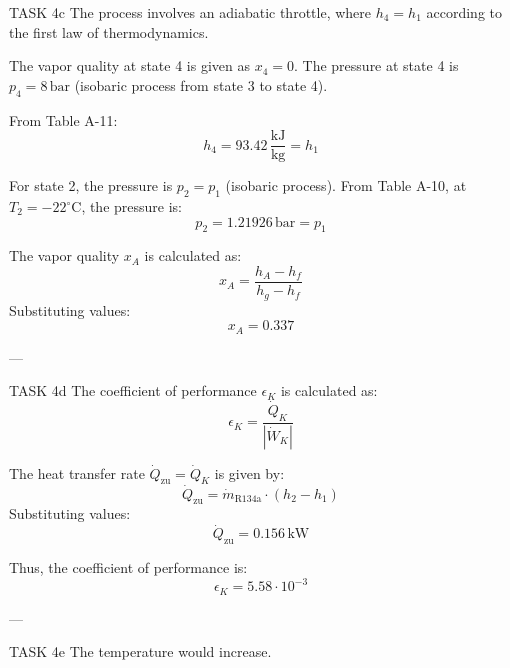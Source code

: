 TASK 4c  
The process involves an adiabatic throttle, where \( h_4 = h_1 \) according to the first law of thermodynamics.  

The vapor quality at state 4 is given as \( x_4 = 0 \). The pressure at state 4 is \( p_4 = 8 \, \text{bar} \) (isobaric process from state 3 to state 4).  

From Table A-11:  
\[
h_4 = 93.42 \, \frac{\text{kJ}}{\text{kg}} = h_1
\]  

For state 2, the pressure is \( p_2 = p_1 \) (isobaric process). From Table A-10, at \( T_2 = -22^\circ\text{C} \), the pressure is:  
\[
p_2 = 1.21926 \, \text{bar} = p_1
\]  

The vapor quality \( x_A \) is calculated as:  
\[
x_A = \frac{h_A - h_f}{h_g - h_f}
\]  
Substituting values:  
\[
x_A = 0.337
\]  

---

TASK 4d  
The coefficient of performance \( \epsilon_K \) is calculated as:  
\[
\epsilon_K = \frac{\dot{Q}_K}{|\dot{W}_K|}
\]  

The heat transfer rate \( \dot{Q}_{\text{zu}} = \dot{Q}_K \) is given by:  
\[
\dot{Q}_{\text{zu}} = \dot{m}_{\text{R134a}} \cdot (h_2 - h_1)
\]  
Substituting values:  
\[
\dot{Q}_{\text{zu}} = 0.156 \, \text{kW}
\]  

Thus, the coefficient of performance is:  
\[
\epsilon_K = 5.58 \cdot 10^{-3}
\]  

---

TASK 4e  
The temperature would increase.  

